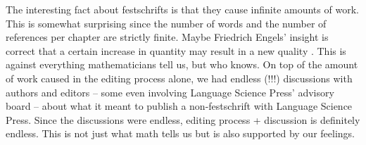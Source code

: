 \documentclass[output=paper,colorlinks,citecolor=brown]{langscibook}
\begin{document}
The interesting fact about festschrifts is that they cause infinite amounts of work. This is somewhat
surprising since the number of words and the number of references per chapter are strictly
finite. Maybe Friedrich Engels' insight is correct that a certain increase in quantity may result in a new
quality \citep[]{Engels1873a-u}. This is against everything mathematicians tell us, but who knows.
On top of the amount of work caused in the editing process alone, we had endless (!!!) discussions
with authors and editors -- some even involving Language Science Press' advisory board -- about what it meant to publish a non-festschrift with Language Science
Press. Since the discussions were endless, editing process + discussion is definitely endless. This
is not just what math tells us but is also supported by our feelings.
\end{document}

